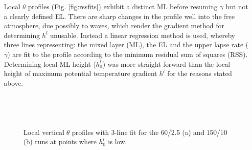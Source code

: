 Local $\theta$ profiles (Fig. \ref{fig:rssfits}) exhibit a distinct \acs{ML} before resuming $\gamma$ but not 
a clearly defined \acs{EL}. There are sharp changes in the profile well into the free atmosphere, due possibly to 
waves, which render the gradient method for determining $h^{l}$ unusable.  Instead a linear regression method is used, 
whereby three lines representing: the mixed layer (ML), the EL and the upper lapse rate ($\gamma$) are fit to the 
profile according to the minimum residual sum of squares (RSS).  Determining local \acs{ML} height ($h_{0}^{l}$) was 
more straight forward than the local height of maximum potential temperature gradient $h^{l}$ for the reasons stated 
above.\\  


\begin{figure}[htbp]
\begin{minipage}[b]{0.5\linewidth}
        \\
        \end{minipage}             
\quad
\begin{minipage}[b]{0.5\linewidth}
        \\
       
       \end{minipage}
        \caption{Local vertical $\theta$ profiles with 3-line fit for the 60/2.5 (a) and 150/10 (b) runs at 
points where $h^{l}_{0}$ is low.}
        \label{fig:rssfitslow}
\end{figure}

